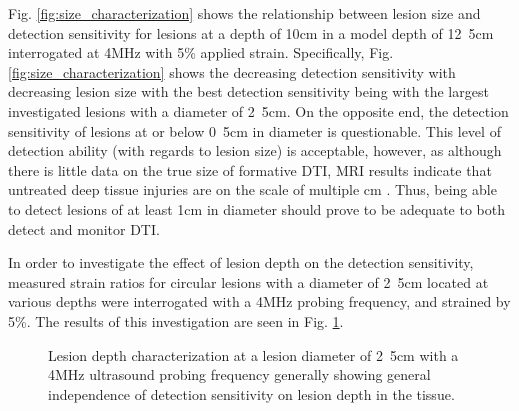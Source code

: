 			Fig. \ref{fig:size_characterization} shows the relationship between lesion size and detection sensitivity for lesions at a depth of \unit{10}{cm} in a model depth of \unit{12.5}{cm} interrogated at \unit{4}{MHz} with \unit{5}{\%} applied strain. Specifically, Fig. \ref{fig:size_characterization} shows the decreasing detection sensitivity with decreasing lesion size with the best detection sensitivity being with the largest investigated lesions with a diameter of \unit{2.5}{cm}. On the opposite end, the detection sensitivity of lesions at or below \unit{0.5}{cm} in diameter is questionable. This level of detection ability (with regards to lesion size) is acceptable, however, as although there is little data on the true size of formative DTI, MRI results indicate that untreated deep tissue injuries are on the scale of multiple cm \cite{solis13}. Thus, being able to detect lesions of at least \unit{1}{cm} in diameter should prove to be adequate to both detect and monitor DTI. 

			In order to investigate the effect of lesion depth on the detection sensitivity, measured strain ratios for circular lesions with a diameter of \unit{2.5}{cm} located at various depths were interrogated with a \unit{4}{MHz} probing frequency, and strained by \unit{5}{\%}. The results of this investigation are seen in Fig. \ref{fig:depth_characterization}.

			\begin{figure}[!t]
				\centering
				\caption[Lesion depth characterization]{Lesion depth characterization at a lesion diameter of \unit{2.5}{cm} with a \unit{4}{MHz} ultrasound probing frequency generally showing general independence of detection sensitivity on lesion depth in the tissue.}
				\label{fig:depth_characterization}
			\end{figure}

